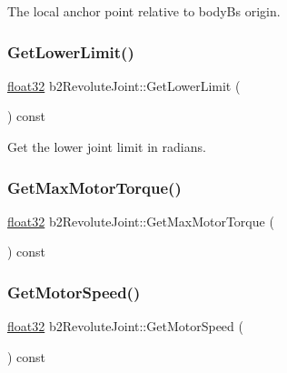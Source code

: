 The local anchor point relative to bodyB\textquotesingle{}s origin. 

\mbox{\label{classb2_revolute_joint_a1e34ad0cc3289d90bff8140c5d6261d2}} 
\subsubsection{\texorpdfstring{GetLowerLimit()}{GetLowerLimit()}}
{\footnotesize\ttfamily \mbox{\hyperlink{b2_settings_8h_aacdc525d6f7bddb3ae95d5c311bd06a1}{float32}} b2\+Revolute\+Joint\+::\+Get\+Lower\+Limit (\begin{DoxyParamCaption}{ }\end{DoxyParamCaption}) const}



Get the lower joint limit in radians. 

\mbox{\label{classb2_revolute_joint_a878308eb3e299e15ac9dc88d48671d51}} 
\subsubsection{\texorpdfstring{GetMaxMotorTorque()}{GetMaxMotorTorque()}}
{\footnotesize\ttfamily \mbox{\hyperlink{b2_settings_8h_aacdc525d6f7bddb3ae95d5c311bd06a1}{float32}} b2\+Revolute\+Joint\+::\+Get\+Max\+Motor\+Torque (\begin{DoxyParamCaption}{ }\end{DoxyParamCaption}) const\hspace{0.3cm}{\ttfamily [inline]}}

\mbox{\label{classb2_revolute_joint_abb1fa43d5779a1164ddfedf6130d7ff2}} 
\subsubsection{\texorpdfstring{GetMotorSpeed()}{GetMotorSpeed()}}
{\footnotesize\ttfamily \mbox{\hyperlink{b2_settings_8h_aacdc525d6f7bddb3ae95d5c311bd06a1}{float32}} b2\+Revolute\+Joint\+::\+Get\+Motor\+Speed (\begin{DoxyParamCaption}{ }\end{DoxyParamCaption}) const\hspace{0.3cm}{\ttfamily [inline]}}



